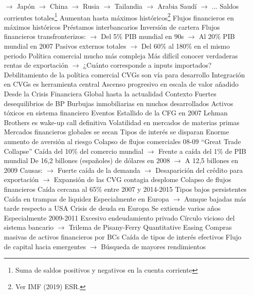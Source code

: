 \documentclass{nuevotema}
\begin{document}
\begin{esquemal}
				\4[] $\to$ Japón
				\4[] $\to$ China
				\4[] $\to$ Rusia
				\4[] $\to$ Tailandia
				\4[] $\to$ Arabia Saudí
				\4[] $\to$ ...
				\4 Saldos corrientes totales\footnote{Suma de saldos positivos y negativos en la cuenta corriente}
				\4[] Aumentan hasta máximos históricos\footnote{Ver IMF (2019) ESR.}
				\4 Flujos financieros en máximos históricos
				\4[] Préstamos interbancarios
				\4[] Inversión de cartera
				\4[] Flujos financieros transfronterizos:
				\4[] $\to$ Del 5\% PIB mundial en 90s
				\4[] $\to$ Al 20\% PIB mundial en 2007
				\4[] Pasivos externos totales
				\4[] $\to$ Del 60\% al 180\% en el mismo periodo
				\4 Política comercial mucho más compleja
				\4[] Más difícil conocer verdaderas rentas de exportación
				\4[] $\to$ ¿Cuánto corresponde a inputs importados?
				\4[] Debilitamiento de la política comercial
				\4 CVGs son vía para desarrollo
				\4[] Integración en CVGs es herramienta central
				\4[] Ascenso progresivo en escala de valor añadido
		\2 Desde la Crisis Financiera Global hasta la actualidad
			\3 Contexto
				\4 Fuertes desequilibrios de BP
				\4 Burbujas inmobiliarias en muchos desarrollados
				\4 Activos tóxicos en sistema financiero
			\3 Eventos
				\4 Estallido de la CFG en 2007
				\4 Lehman Brothers es wake-up call definitiva
				\4 Volatilidad en mercados de materias primas
				\4 Mercados financieros globales se secan
				\4[] Tipos de interés se disparan
				\4[] Enorme aumento de aversión al riesgo
				\4 Colapso de flujos comerciales 08-09
				\4[] ``Great Trade Collapse''
				\4[] Caída del 10\% del comercio mundial
				\4[] $\to$ Frente a caída del 1\% de PIB mundial
				\4[] De 16,2 billones (españoles) de dólares en 2008
				\4[] $\to$ A 12,5 billones en 2009
				\4[] Causas:
				\4[] $\to$ Fuerte caída de la demanda
				\4[] $\to$ Desaparición del crédito para exportación
				\4[] $\to$ Expansión de las CVG contagia desplome
				\4 Colapso de flujos financieros
				\4[] Caída cercana al 65\% entre 2007 y 2014-2015
				\4 Tipos bajos persistentes
				\4[] Caída en trampas de liquidez
				\4[] Especialmente en Europa
				\4[] $\to$ Aunque bajadas más tarde respecto a USA
				\4 Crisis de deuda en Europa
				\4[] Se extiende varios años
				\4[] Especialmente 2009-2011
				\4[] Excesivo endeudamiento privado
				\4[] Círculo vicioso del sistema bancario
				\4[] $\to$ Trilema de Pisany-Ferry
				\4 Quantitative Easing
				\4[] Compras masivas de activos financieros por BCs
				\4[] Caída de tipos de interés efectivos
				\4[] Flujo de capital hacia emergentes
				\4[] $\to$ Búsqueda de mayores rendimientos

\end{esquemal}
\end{document}
